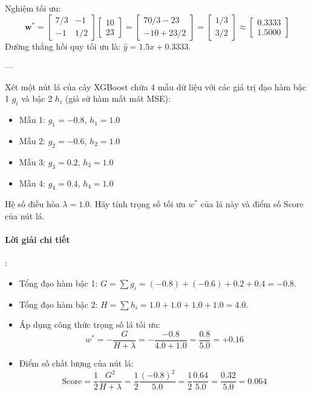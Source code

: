 \begin{itemize}
\begin{equation*}
  \end{equation*}
  Nghiệm tối ưu:
  \begin{equation*}
  \mathbf{w}^* = \begin{bmatrix} 7/3 & -1 \\ -1 & 1/2 \end{bmatrix} \begin{bmatrix} 10 \\ 23 \end{bmatrix} = \begin{bmatrix} 70/3 - 23 \\ -10 + 23/2 \end{bmatrix} = \begin{bmatrix} 1/3 \\ 3/2 \end{bmatrix} \approx \begin{bmatrix} 0.3333 \\ 1.5000 \end{bmatrix}
  \end{equation*}
  Đường thẳng hồi quy tối ưu là: $\hat{y} = 1.5 x + 0.3333$.
\end{itemize}

---

\begin{example}
Xét một nút lá của cây XGBoost chứa 4 mẫu dữ liệu với các giá trị đạo hàm bậc 1 $g_i$ và bậc 2 $h_i$ (giả sử hàm mất mát MSE):
\begin{itemize}
  \item Mẫu 1: $g_1 = -0.8$, $h_1 = 1.0$
  \item Mẫu 2: $g_2 = -0.6$, $h_2 = 1.0$
  \item Mẫu 3: $g_3 = 0.2$, $h_3 = 1.0$
  \item Mẫu 4: $g_4 = 0.4$, $h_4 = 1.0$
\end{itemize}
Hệ số điều hòa $\lambda = 1.0$. Hãy tính trọng số tối ưu $w^*$ của lá này và điểm số Score của nút lá.
\end{example}

\paragraph{Lời giải chi tiết}:
\begin{itemize}
  \item[1)] Tổng đạo hàm bậc 1: $G = \sum g_i = (-0.8) + (-0.6) + 0.2 + 0.4 = -0.8$.
  \item[2)] Tổng đạo hàm bậc 2: $H = \sum h_i = 1.0 + 1.0 + 1.0 + 1.0 = 4.0$.
  \item[3)] Áp dụng công thức trọng số lá tối ưu:
  \begin{equation*}
  w^* = -\frac{G}{H + \lambda} = -\frac{-0.8}{4.0 + 1.0} = \frac{0.8}{5.0} = +0.16
  \end{equation*}
  \item[4)] Điểm số chất lượng của nút lá:
  \begin{equation*}
  \text{Score} = \frac{1}{2} \frac{G^2}{H + \lambda} = \frac{1}{2} \frac{(-0.8)^2}{5.0} = \frac{1}{2} \frac{0.64}{5.0} = \frac{0.32}{5.0} = 0.064
  \end{equation*}
\end{itemize}

